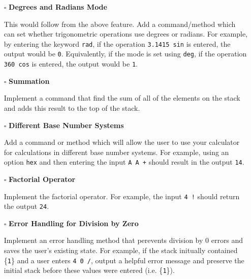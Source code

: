 \documentclass{article}
\begin{document}
\begin{itemize}
  \item[$\square$] \textbf{Degrees and Radians Mode}
  
	This would follow from the above feature. Add a command/method which can set whether trigonometric operations use degrees or radians. For example, by entering the keyword \texttt{rad}, if the operation \texttt{3.1415 sin} is entered, the output would be \texttt{0}. Equivalently, if the mode is set using \texttt{deg}, if the operation \texttt{360 cos} is entered, the output would be \texttt{1}.\newline
\end{itemize}

\begin{itemize}
  \item[$\square$] \textbf{Summation}
  
Implement a command that find the sum of all of the elements on the stack and adds this result to the top of the stack.\newline
\end{itemize}

\begin{itemize}
  \item[$\square$] \textbf{Different Base Number Systems}
  
Add a command or method which will allow the user to use your calculator for calculations in different base number systems. For example, using an option \texttt{hex} and then entering the input \texttt{A A +} should result in the output \texttt{14}.\newline 
\end{itemize}


\begin{itemize}
  \item[$\square$] \textbf{Factorial Operator}
  
Implement the factorial operator. For example, the input \texttt{4 !} should return the output \texttt{24}. \newline
\end{itemize}

\begin{itemize}
  \item[$\square$] \textbf{Error Handling for Division by Zero}
  
Implement an error handling method that perevents division by 0 errors and saves the user's existing state. For example, if the stack initually contained \{\texttt{1}\} and a user enters \texttt{4 0 /}, output a helpful error message and preserve the initial stack before these values were entered (i.e. \{\texttt{1}\}). \newline
\end{itemize}
\end{document}
